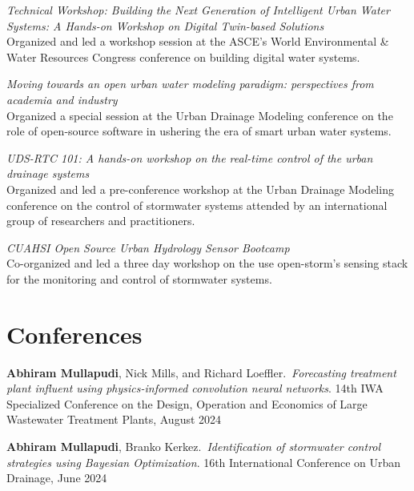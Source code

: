 \documentclass[a4paper,11pt]{article}
\newcommand{\years}[1]{%
  {\reversemarginpar\strut\marginnote{{\small#1}}}%
}
\begin{document}
\years{2023} \emph{Technical Workshop: Building the Next Generation of Intelligent Urban Water
Systems: A Hands-on Workshop on Digital Twin-based Solutions}\\[0.2cm]
Organized and led a workshop session at the ASCE’s World Environmental \& Water Resources Congress conference on building
digital water systems.\\[.1cm]

\years{2022} \emph{Moving towards an open urban water modeling paradigm: perspectives from academia and industry}\\[.2cm]
Organized a special session at the Urban Drainage Modeling conference on the
role of open-source software in ushering the era of smart urban water systems.\\[.1cm]

\years{2022} \emph{UDS-RTC 101: A hands-on workshop on the real-time control of the urban drainage systems}\\[.2cm]
Organized and led a pre-conference workshop at the Urban Drainage Modeling
conference on the control of stormwater systems attended by an international
group of researchers and practitioners.\\[.1cm]

\years{2017, 2019} \emph{CUAHSI Open Source Urban Hydrology Sensor Bootcamp}\\[.2cm]
Co-organized and led a three day workshop on the use open-storm’s sensing stack
for the monitoring and control of stormwater systems.

\section*{Conferences}

\years{2024} \textbf{Abhiram Mullapudi}, Nick Mills, and Richard Loeffler.\ \emph{Forecasting treatment plant influent using physics-informed convolution neural networks}. 14th IWA Specialized Conference on the Design, Operation and Economics of Large Wastewater Treatment Plants, August 2024\\[.1cm]

\years{2024} \textbf{Abhiram Mullapudi}, Branko Kerkez.\ \emph{Identification of stormwater control strategies using Bayesian Optimization}. 16th International Conference on Urban Drainage, June 2024\\[.1cm]
\end{document}

